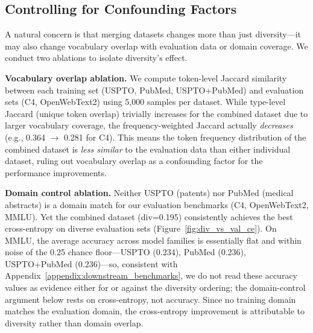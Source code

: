 \subsection{Controlling for Confounding Factors} \label{sec:confounding}
A natural concern is that merging datasets changes more than just diversity---it may also change vocabulary overlap with evaluation data or domain coverage.
We conduct two ablations to isolate diversity's effect.

\textbf{Vocabulary overlap ablation.}
We compute token-level Jaccard similarity between each training set (USPTO, PubMed, USPTO+PubMed) and evaluation sets (C4, OpenWebText2) using 5,000 samples per dataset.
While type-level Jaccard (unique token overlap) trivially increases for the combined dataset due to larger vocabulary coverage, the frequency-weighted Jaccard actually \emph{decreases} (e.g., 0.364 $\to$ 0.281 for C4).
This means the token frequency distribution of the combined dataset is \emph{less similar} to the evaluation data than either individual dataset, ruling out vocabulary overlap as a confounding factor for the performance improvements.

\textbf{Domain control ablation.}
Neither USPTO (patents) nor PubMed (medical abstracts) is a domain match for our evaluation benchmarks (C4, OpenWebText2, MMLU).
Yet the combined dataset (div=0.195) consistently achieves the best cross-entropy on diverse evaluation sets (Figure~\ref{fig:div_vs_val_ce}).
On MMLU, the average accuracy across model families is essentially flat and within noise of the 0.25 chance floor---USPTO (0.234), PubMed (0.236), USPTO+PubMed (0.236)---so, consistent with Appendix~\ref{appendix:downstream_benchmarks}, we do not read these accuracy values as evidence either for or against the diversity ordering; the domain-control argument below rests on cross-entropy, not accuracy.
Since no training domain matches the evaluation domain, the cross-entropy improvement is attributable to diversity rather than domain overlap.


